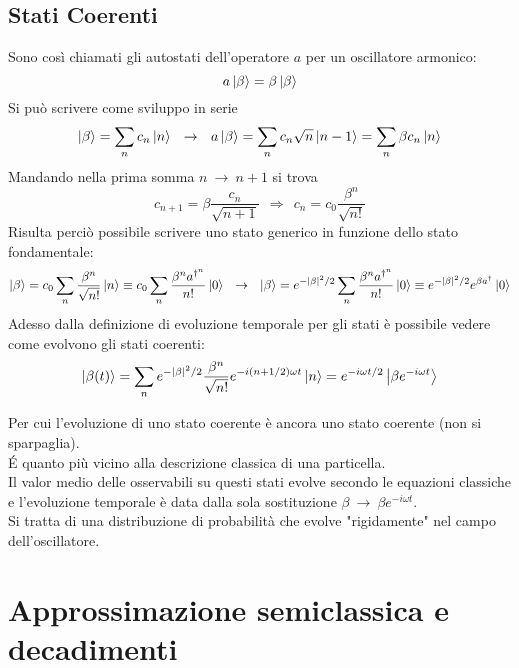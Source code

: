 \documentclass[twoside]{article}
\begin{document}
\subsection{Stati Coerenti}
Sono così chiamati gli autostati dell'operatore $a$ per un oscillatore armonico:
\begin{equation}
    a\ket{\beta}=\beta\ket{\beta}
\end{equation}
Si può scrivere come sviluppo in serie
\begin{equation}
    \ket{\beta}=\displaystyle\sum_{n}c_n\ket{n} \ \ \rightarrow \ \ a\ket{\beta}=\displaystyle\sum_{n}c_n\sqrt{n}\ket{n-1}=\displaystyle\sum_{n}\beta c_n\ket{n}
\end{equation}
Mandando nella prima somma $n \ \rightarrow \ n+1$ si trova 
\begin{equation}
    c_{n+1}=\beta\frac{c_n}{\sqrt{n+1}} \ \ \Rightarrow \ \ c_n=c_0\frac{\beta^n}{\sqrt{n!}}
\end{equation}
Risulta perciò possibile scrivere uno stato generico in funzione dello stato fondamentale:
\begin{equation}
    \ket{\beta}=c_0\displaystyle\sum_{n}\frac{\beta^n}{\sqrt{n!}}\ket{n}\equiv c_0\displaystyle\sum_{n}\frac{\beta^n a^{\dagger^{n}}}{n!}\ket{0} \ \ \rightarrow \ \ \ket{\beta}=e^{-|\beta|^2/2}\displaystyle\sum_{n}\frac{\beta^n a^{\dagger^{n}}}{n!}\ket{0}\equiv e^{-|\beta|^2/2}e^{\beta a^{\dagger}}\ket{0}
\end{equation}
Adesso dalla definizione di evoluzione temporale per gli stati è possibile vedere come evolvono gli stati coerenti:
\begin{equation}
    \ket{\beta(t)}=\displaystyle\sum_{n}e^{-|\beta|^2/2}\frac{\beta^n}{\sqrt{n!}}e^{-i(n+1/2)\omega t}\ket{n}=e^{-i\omega t/2}\ket{\beta e^{-i\omega t}}
\end{equation}

Per cui l'evoluzione di uno stato coerente è ancora uno stato coerente (non si sparpaglia). \\ 
\'E quanto più vicino alla descrizione classica di una particella. \\
Il valor medio delle osservabili su questi stati evolve secondo le equazioni classiche e l'evoluzione temporale è data dalla sola sostituzione $\beta \ \rightarrow \ \beta e^{-i\omega t}$.
\\
Si tratta di una distribuzione di probabilità che evolve "rigidamente" nel campo dell'oscillatore.

\newpage

\section{Approssimazione semiclassica e decadimenti}
\end{document}
